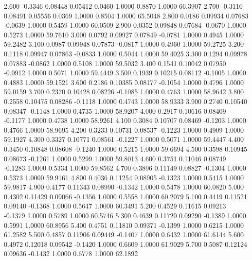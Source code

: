    2.600  -0.3346   0.08448   0.05412   0.0460   1.0000   0.8870   1.0000  66.3907
   2.700  -0.3110   0.08491   0.05556   0.0369   1.0000   0.8504   1.0000  65.5048
   2.800   0.0186   0.09934   0.07683  -0.0639   1.0000   0.5459   1.0000  60.0509
   2.900   0.0352   0.09848   0.07684  -0.0670   1.0000   0.5273   1.0000  59.7610
   3.000   0.0792   0.09927   0.07849  -0.0781   1.0000   0.4945   1.0000  59.2482
   3.100   0.0987   0.09948   0.07873  -0.0817   1.0000   0.4960   1.0000  59.2725
   3.200   0.1118   0.09947   0.07863  -0.0833   1.0000   0.5044   1.0000  59.4025
   3.300   0.1294   0.09978   0.07883  -0.0862   1.0000   0.5108   1.0000  59.5032
   3.400   0.1541   0.10042   0.07950  -0.0912   1.0000   0.5071   1.0000  59.4449
   3.500   0.1939   0.10215   0.08112  -0.1005   1.0000   0.4883   1.0000  59.1521
   3.600   0.2186   0.10385   0.08177  -0.1054   1.0000   0.4796   1.0000  59.0159
   3.700   0.2370   0.10428   0.08226  -0.1085   1.0000   0.4763   1.0000  58.9642
   3.800   0.2558   0.10475   0.08286  -0.1118   1.0000   0.4743   1.0000  58.9333
   3.900   0.2740   0.10540   0.08347  -0.1148   1.0000   0.4735   1.0000  58.9207
   4.000   0.2917   0.10616   0.08409  -0.1177   1.0000   0.4738   1.0000  58.9261
   4.100   0.3084   0.10707   0.08469  -0.1203   1.0000   0.4766   1.0000  58.9695
   4.200   0.3233   0.10731   0.08537  -0.1223   1.0000   0.4909   1.0000  59.1927
   4.300   0.3327   0.10771   0.08561  -0.1227   1.0000   0.5071   1.0000  59.4447
   4.400   0.3450   0.10848   0.08608  -0.1240   1.0000   0.5215   1.0000  59.6694
   4.500   0.3598   0.10945   0.08673  -0.1261   1.0000   0.5299   1.0000  59.8013
   4.600   0.3751   0.11046   0.08749  -0.1283   1.0000   0.5334   1.0000  59.8562
   4.700   0.3896   0.11149   0.08827  -0.1304   1.0000   0.5373   1.0000  59.9161
   4.800   0.4036   0.11254   0.08905  -0.1323   1.0000   0.5415   1.0000  59.9817
   4.900   0.4177   0.11343   0.08990  -0.1342   1.0000   0.5478   1.0000  60.0820
   5.000   0.4302   0.11429   0.09066  -0.1356   1.0000   0.5558   1.0000  60.2079
   5.100   0.4419   0.11521   0.09140  -0.1368   1.0000   0.5647   1.0000  60.3491
   5.200   0.4529   0.11615   0.09213  -0.1379   1.0000   0.5789   1.0000  60.5746
   5.300   0.4639   0.11720   0.09290  -0.1389   1.0000   0.5991   1.0000  60.8956
   5.400   0.4751   0.11810   0.09371  -0.1399   1.0000   0.6215   1.0000  61.2582
   5.500   0.4857   0.11906   0.09449  -0.1407   1.0000   0.6432   1.0000  61.6144
   5.600   0.4972   0.12018   0.09542  -0.1420   1.0000   0.6609   1.0000  61.9029
   5.700   0.5087   0.12124   0.09636  -0.1432   1.0000   0.6778   1.0000  62.1892

